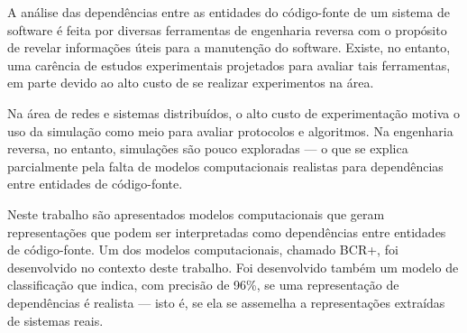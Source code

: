 
A análise das dependências entre as entidades do código-fonte de um sistema de software é feita por diversas ferramentas de engenharia reversa com o propósito de revelar informações úteis para a manutenção do software. Existe, no entanto, uma carência de estudos experimentais projetados para avaliar tais ferramentas, em parte devido ao alto custo de se realizar experimentos na área. 

Na área de redes e sistemas distribuídos, o alto custo de experimentação motiva o uso da simulação como meio para avaliar protocolos e algoritmos. Na engenharia reversa, no entanto, simulações são pouco exploradas --- o que se explica parcialmente pela falta de modelos computacionais realistas para dependências entre entidades de código-fonte.

Neste trabalho são apresentados modelos computacionais que geram representações que podem ser interpretadas como dependências entre entidades de código-fonte. Um dos modelos computacionais, chamado BCR+, foi desenvolvido no contexto deste trabalho. Foi desenvolvido também um modelo de classificação que indica, com precisão de 96\%, se uma representação de dependências é realista --- isto é, se ela se assemelha a representações extraídas de sistemas reais. %


